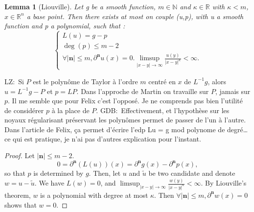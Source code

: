 \documentclass[12pt, a4paper]{article}
\newtheorem{lemma}[theorem]{Lemma}
\newcommand{\R}{\mathbb{R}}
\newcommand{\N}{\mathbb{N}}
\newcommand{\mn}{\mathbf{n}}
\newcommand{\abs}[1]{\left| #1 \right|}
\newcommand{\gdb}[1]{\begingroup\color{red}GDB:\ #1\endgroup}
\newcommand{\lz}[1]{\begingroup\color{blue}LZ:\ #1\endgroup}
\begin{document}
\begin{lemma}[Liouville]
    Let g be a smooth function, $m\in \N$ and $\kappa\in \R$ with $\kappa<m$, $x\in \R^n$ a base point.
    Then there exists at most on couple (u,p), with u a smooth function and p a polynomial, such that : 
    $$
    \begin{cases}
        L(u)= g - p \\
        \operatorname*{deg}(p)\leq m-2 \\
        \forall \abs{\mn} \leq m, \partial^\mn u(x) = 0.
        \limsup_{\abs{x-y}\to \infty} \frac{u(y)}{\abs{x-y}^\kappa} < \infty.
    \end{cases}
    $$
\end{lemma}
\lz{Si $P$ est le polynôme de Taylor à l'ordre $m$ centré en $x$ de $L^{-1}g$, alors $u=L^{-1}g-P$ et $p=LP$.
Dans l'approche de Martin on travaille sur $P$, jamais sur $p$. Il me semble que pour Felix c'est l'opposé. Je ne comprends
pas bien l'utilité de considérer $p$ à la place de $P$.}
\gdb{Effectivement, et l'hypothèse sur les noyaux régularisant préservant les polynômes permet de passer de l'un à l'autre. Dans l'article de Felix, ça permet d'écrire l'edp Lu = g mod polynome de degré\dots ce qui est pratique, je n'ai pas d'autres explication pour l'instant.}
\begin{proof}
    Let $\abs{\mn} \leq m - 2$.
    \begin{equation*}
        0 = \partial^\mn(L(u))(x) = \partial^\mn g(x) -\partial^\mn p(x),
    \end{equation*}
so that $p$ is determined by $g$.
Then, let $u$ and $\tilde{u}$ be two candidate and denote $w = u - \tilde{u}$.
We have $L(w) = 0$, and $\limsup_{\abs{x-y}\to \infty} \frac{w(y)}{\abs{x-y}^\kappa} < \infty$. By Liouville's theorem, $w$ is a polynomial with degree at most $\kappa$.
Then $\forall \abs{\mn} \leq m, \partial^\mn w(x) = 0$ shows that $w=0$.
\end{proof}
\end{document}
